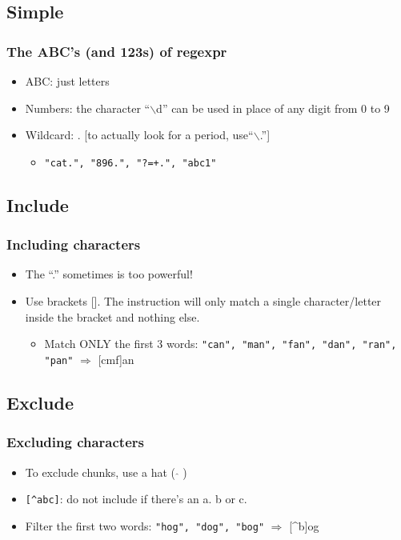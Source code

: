 \documentclass[xcolor=x11names,compress]{beamer}
\renewcommand{\(}{\begin{columns}}
\renewcommand{\)}{\end{columns}}
\newcommand{\<}[1]{\begin{column}{#1}}
\renewcommand{\>}{\end{column}}
\begin{document}
\subsection{Simple}
\begin{frame}[fragile]
\frametitle{The ABC's (and 123s) of regexpr}
\begin{itemize}
	\item ABC: just letters
	\item Numbers: the character ``$\backslash$d'' can be used in place of any digit from 0 to 9
	\item Wildcard: . [to actually look for a period, use``$\backslash$.'']
	\begin{itemize}
		\item \texttt{"cat.", "896.", "?=+.", "abc1"}
	\end{itemize} 
\end{itemize}
\end{frame}

\subsection{Include}
\begin{frame}[fragile]
\frametitle{Including characters}
\begin{itemize}
	\item The ``.'' sometimes is too powerful!
	\item Use brackets \textcolor{brick}{[]}. The instruction will only match \textcolor{redwine}{a single} character/letter inside the bracket and nothing else.
	\begin{itemize}
	\item Match ONLY the first 3 words: \texttt{"can", "man", "fan", "dan", "ran", "pan"} \pause $\Rightarrow$ [cmf]an
	\end{itemize}
\end{itemize}
\end{frame}
\subsection{Exclude}
\begin{frame}[fragile]
\frametitle{Excluding characters}
\begin{itemize}
	\item To exclude chunks, use a hat ( $\hat{ }$ )
	\item \texttt{[\^{}abc]}: do not include if there's an a. b or c.
	\item Filter the first two words: \texttt{"hog", "dog", "bog"} \pause $\Rightarrow$ [\^{ }b]og
\end{itemize}
\end{frame}
\end{document}
